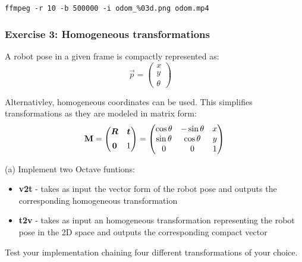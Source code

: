 \documentclass[12pt,a4paper]{article}
\begin{document}
\texttt{ffmpeg -r 10 -b 500000 -i odom\_\%03d.png odom.mp4}

\subsubsection*{Exercise 3: Homogeneous transformations}

A robot pose in a given frame is compactly represented as:
\begin{equation*}
      \vec p = \left(\begin{array}{c} x \\ y \\ \theta \end{array}\right) \quad
\end{equation*}


Alternativley, homogeneous coordinates can be used. This simplifies transformations as they are modeled  in matrix form:
\begin{equation*}
  \vec M =
    \begin{pmatrix}
       \vspace{0.5em} \boldsymbol{R} & \boldsymbol{t}\\
       \boldsymbol{0} & 1\\
    \end{pmatrix}
    =
    \begin{pmatrix}
      \cos{\theta} & -\sin{\theta} & x\\
      \sin{\theta} & \cos{\theta} & y\\
      0 & 0 & 1\\
    \end{pmatrix}
\end{equation*}


(a) Implement two Octave funtions:
\begin{itemize}
  \item \textbf{v2t} - takes as input the vector form of the robot pose and outputs the corresponding homogeneous transformation
  \item \textbf{t2v} - takes as input an homogeneous transformation representing the robot pose in the 2D space and outputs the corresponding compact vector
\end{itemize}

Test your implementation chaining four different transformations of your choice.

\vspace{2em}
\end{document}
